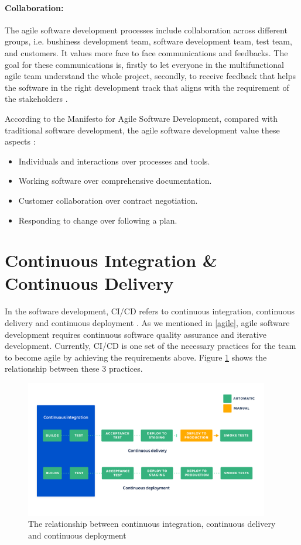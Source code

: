 \paragraph{Collaboration:}
The agile software development processes include collaboration across different groups, i.e. bushiness development team, software development team, test team, and customers. It values more face to face communications \cite{beck2001principles} and feedbacks. The goal for these communications is, firstly to let everyone in the multifunctional agile team understand the whole project, secondly, to receive feedback that helps the software in the right development track that aligns with the requirement of the stakeholders \cite{beck2001manifesto}. 
\par
According to the Manifesto for Agile Software Development, compared with traditional software development, the agile software development value these aspects \cite{beck2001manifesto}: 
\begin{itemize}
\item Individuals and interactions over processes and tools.
\item Working software over comprehensive documentation.
\item Customer collaboration over contract negotiation.
\item Responding to change over following a plan.
\end{itemize}
\section{Continuous Integration \& Continuous Delivery}
In the software development, CI/CD refers to continuous integration, continuous delivery and continuous deployment \cite{pittet2018continuous}. As we mentioned in \ref{agile}, agile software development requires continuous software quality assurance and iterative development. Currently, CI/CD is one set of the necessary practices for the team to become agile by achieving the requirements above. Figure \ref{fig:cicd} shows the relationship between these 3 practices.
\begin{figure}[h]
    \centering
    \includegraphics[width=0.95\textwidth]{pics/cicd.png}
    \caption{The relationship between continuous integration, continuous delivery and continuous deployment \cite{pittet2018continuous}}
    \label{fig:cicd}
\end{figure}

